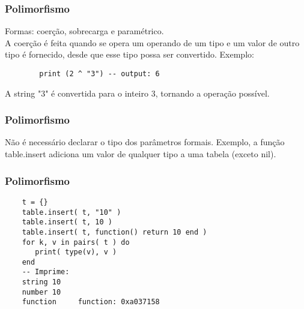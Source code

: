 \begin{frame}[fragile]
  \frametitle{Polimorfismo}
  \begin{block}{}
    \centering
    Formas: coerção, sobrecarga e paramétrico.\\

    A coerção é feita quando se opera um operando de um tipo e um valor
    de outro tipo é fornecido, desde que esse tipo possa ser convertido.
    Exemplo:
    
  \begin{block}{}
    \begin{lstlisting}
        print (2 ^ "3") -- output: 6
    \end{lstlisting}
  \end{block}
    
    A string "3" é convertida para o inteiro 3,
    tornando a operação possível.
  \end{block}
\end{frame}

\begin{frame}[fragile]
  \frametitle{Polimorfismo}
  \begin{block}{}
    \centering
Não é necessário declarar o tipo dos parâmetros formais. 
Exemplo, a função table.insert adiciona um valor de qualquer
tipo a uma tabela (exceto nil).
  \end{block}
\end{frame}

\begin{frame}[fragile]
  \frametitle{Polimorfismo}
  \begin{block}{}
    \centering
    \begin{lstlisting}
    t = {}
    table.insert( t, "10" )
    table.insert( t, 10 )
    table.insert( t, function() return 10 end )
    for k, v in pairs( t ) do
       print( type(v), v )
    end
    -- Imprime:
    string 10
    number 10
    function     function: 0xa037158
    \end{lstlisting}
  \end{block}
\end{frame}
